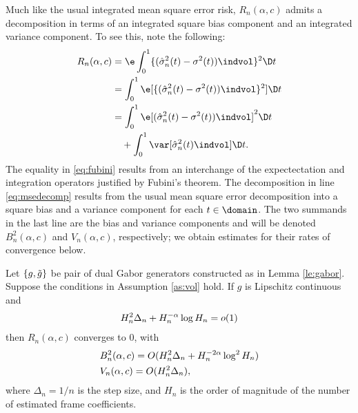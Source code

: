 Much like the usual integrated mean square error risk, $R_n(\alpha,c)$ admits a decomposition in terms of an integrated square bias component and an integrated variance component. To see this, note the following:
\begin{align}
  R_n(\alpha, c ) & = \e \int_0^1  \{(\svn(t) - \sigma^2(t))\indvol\}^2 \D t \\ 
  & = \int_0^1 \e[ \{(\svn(t) - \sigma^2(t))\indvol\}^2] \D t \label{eq:fubini}\\ 
& = \int_0^1 \e[ (\svn(t) - \sigma^2(t))\indvol]^2 \D t \notag \\
& \quad + \int_0^1 \var[\svn(t)\indvol] \D t. \label{eq:msedecomp}
\end{align}
The equality in \eqref{eq:fubini} results from an interchange of the expectectation and integration operators justified by Fubini's theorem. The decomposition in line  \eqref{eq:msedecomp} results from the usual mean square error decomposition  into a square bias and a variance component for each  $t \in \domain$. The two summands in the last line are the bias and variance components and will be denoted $B_n^2(\alpha,c)$ and $V_n(\alpha,c)$, respectively; we obtain estimates for their rates of convergence below.
\begin{prop} \label{pr:consistency}
  Let $\{g, \tilde{g}\}$ be pair of dual Gabor generators constructed as in Lemma \eqref{le:gabor}.   Suppose the conditions in  Assumption \eqref{as:vol}  hold. If $g$ is Lipschitz continuous and  
  \begin{align}
    H_n^2 \Delta_n  + H_n^{-\alpha} \log H_n= o(1) \notag
    \label{}
  \end{align}
   then $R_n(\alpha,c)$ converges to 0, with 
  \begin{align}
    & B_n^2(\alpha,c)  = O(H_n^2\Delta_n  + H_n^{-2\alpha} \log^2 H_n)\notag \\
    & V_n(\alpha,c)  = O(H_n^2 \Delta_n),
    \label{}
  \end{align}
  where  $\Delta_n = 1/n$ is the step size, and $H_n$ is the order of magnitude of the number of estimated frame coefficients. 
\end{prop}
